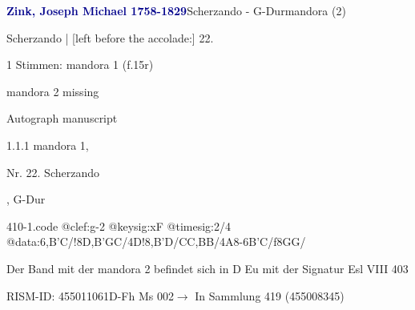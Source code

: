 \documentclass[twocolumn]{book}
\begin{document}
\par \vspace{7pt} \textcolor{darkblue}{\textbf{Zink, Joseph Michael  1758-1829}}\hfillplus{\textbf{[410]}}\newline Scherzando - G-Dur\newline mandora (2)
\par \begin{itshape}[f.15r, at left:] Scherzando | [left before the accolade:] 22.\end{itshape} 
\par \textcolor{darkblue}{}  1 Stimmen: mandora 1  (f.15r)\newline \begin{small} mandora 2 missing\end{small} \newline Autograph manuscript
\par 1.1.1  mandora 1, \begin{itshape}Nr. 22. Scherzando\end{itshape}, G-Dur  
\begin{filecontents*}{410-1.code}
@clef:g-2
@keysig:xF
@timesig:2/4
@data:{6,B'C}/!8D,B'GC/4D!8,B'D/CC,BB/4A8-{6B'C}/f{8GG}/
\end{filecontents*}
\newline
%
\par Der Band mit der mandora 2 befindet sich in D Eu mit der Signatur Esl VIII 403
\par RISM-ID: 455011061\newline D-Fh  Ms 002\newline $\rightarrow$ In Sammlung 419 (455008345)
      
\end{document}
